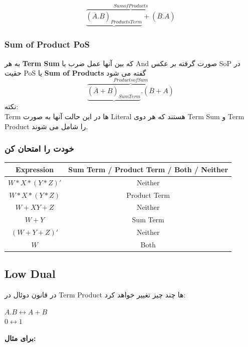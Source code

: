 \documentclass[pt, a5paper]{article}
\begin{document}
\begin{equation}
	\overbrace{\underbrace{(\overline{A}.B)_{Products Term}} + (\overline{B}.A)}^{Sum of Products}
\end{equation}

\subsubsection{Sum of Product PoS}
	به هر \textbf{Term Sum} که بین آنها عمل ضرب یا And صورت گرفته بر عکس	 SoP در حقیت PoS یا\textbf{ Sum of Products }گفته می شود\\
\begin{equation}
	\overbrace{\underbrace{(\overline{A}+B)_{Sum Term}} . (\overline{B}+A)}^{Products of Sum}
\end{equation}
نکته:\\

	Term
ها
در این حالت آنها به صورت Literal هستند که هر دوی Term Sum و Term Product را شامل می شوند.

\newpage

\subsubsection{خودت را امتحان کن}
\center
\begin{LTR}
	\begin{tabular}{ c | c}
		Expression & Sum Term / Product Term / Both / Neither \\
		\hline
		$W*X*(Y*Z)'$ & Neither\\
		$W*X*(Y*Z)$ & Product Term\\
		$W+XY+Z$ & Neither\\
		$W+Y$ & Sum Term\\
		$(W+Y+Z)'$ & Neither\\
		$W$ & Both\\
	\end{tabular}

\end{LTR}

\raggedleft
\justifying
\subsection{Low Dual}
در قانون دوئال در Term Product ها چند چیز تغییر خواهد کرد:\\

\raggedright
$A.B \leftrightarrow A+B$\\
$0 \leftrightarrow 1$

\raggedleft
\justifying
\textbf{برای مثال:}\\
\end{document}
